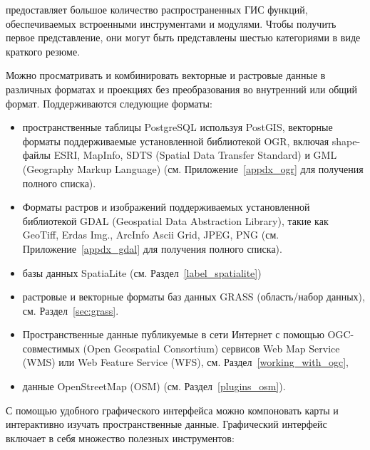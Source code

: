\qg предоставляет большое количество распространенных ГИС функций,
обеспечиваемых встроенными инструментами и модулями. Чтобы получить
первое представление, они могут быть представлены шестью категориями в
виде краткого резюме.


Можно просматривать и комбинировать векторные и растровые данные в
различных форматах и проекциях без преобразования во внутренний или
общий формат. Поддерживаются следующие форматы:

\begin{itemize}[label=--]
\item пространственные таблицы PostgreSQL используя PostGIS, векторные
форматы
поддерживаемые установленной библиотекой OGR, включая shape-файлы ESRI,
MapInfo, SDTS (Spatial Data Transfer Standard) и GML (Geography Markup
Language) (см. Приложение~\ref{appdx_ogr} для получения полного списка).
\item Форматы растров и изображений поддерживаемых установленной
библиотекой GDAL (Geospatial Data Abstraction Library), такие как
GeoTiff, Erdas Img., ArcInfo Ascii Grid, JPEG, PNG (см. Приложение~\ref{appdx_gdal}
для получения полного списка).
\item базы данных SpatiaLite (см. Раздел~\ref{label_spatialite})
\item растровые и векторные форматы баз данных GRASS (область/набор данных),
см. Раздел~\ref{sec:grass}.
\item Пространственные данные публикуемые в сети Интернет с помощью
OGC-совместимых (Open Geospatial Consortium) сервисов Web Map Service
(WMS) или Web Feature Service (WFS), см. Раздел~\ref{working_with_ogc},
\item данные OpenStreetMap (OSM) (см. Раздел~\ref{plugins_osm}).
\end{itemize}


С помощью удобного графического интерфейса можно компоновать карты и
интерактивно изучать пространственные данные. Графический интерфейс
включает в себя множество полезных инструментов:

